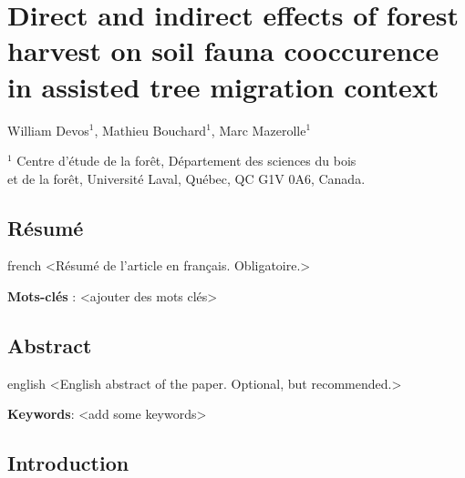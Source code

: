 \chapter{Direct and indirect effects of forest harvest on soil fauna cooccurence in assisted tree migration context}     %
\label{chapitre1-articles}    

William Devos$^1$, Mathieu Bouchard$^1$, Marc Mazerolle$^1$

$^1$ Centre d'étude de la forêt, Département des sciences du bois \\ 
et de la forêt, Université Laval, Québec, QC G1V 0A6, Canada. \\ 

\clearpage

\section*{Résumé}
\label{sec:resume1}

\begin{otherlanguage*}{french}
  <Résumé de l'article en français. Obligatoire.>

  \textbf{Mots-clés} : <ajouter des mots clés>
\end{otherlanguage*}

\clearpage

\section*{Abstract}
\label{sec:abstract1}

\begin{otherlanguage*}{english}
  <English abstract of the paper. Optional, but recommended.>

\textbf{Keywords}: <add some keywords> 
\end{otherlanguage*}

\cleardoublepage

\section*{Introduction}
\label{sec:intro1}



